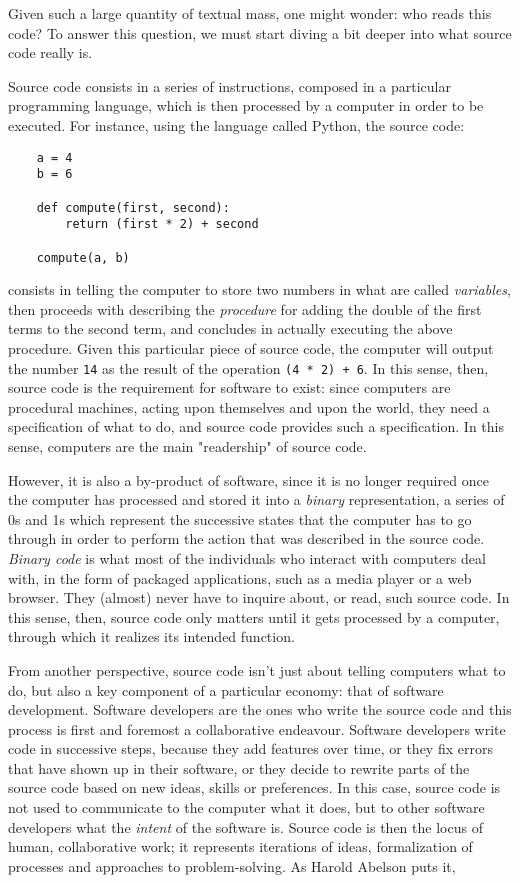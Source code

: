 Given such a large quantity of textual mass, one might wonder: who reads this code? To answer this question, we must start diving a bit deeper into what source code really is.

Source code consists in a series of instructions, composed in a particular programming language, which is then processed by a computer in order to be executed. For instance, using the language called Python, the source code:

\begin{lstlisting}
    a = 4
    b = 6

    def compute(first, second):
        return (first * 2) + second
    
    compute(a, b)
\end{lstlisting}

consists in telling the computer to store two numbers in what are called \emph{variables}, then proceeds with describing the \emph{procedure} for adding the double of the first terms to the second term, and concludes in actually executing the above procedure. Given this particular piece of source code, the computer will output the number \lstinline{14} as the result of the operation \lstinline{(4 * 2) + 6}. In this sense, then, source code is the requirement for software to exist: since computers are procedural machines, acting upon themselves and upon the world, they need a specification of what to do, and source code provides such a specification. In this sense, computers are the main "readership" of source code.

However, it is  also a by-product of software, since it is no longer required once the computer has processed and stored it into a \emph{binary} representation, a series of 0s and 1s which represent the successive states that the computer has to go through in order to perform the action that was described in the source code. \emph{Binary code} is what most of the individuals who interact with computers deal with, in the form of packaged applications, such as a media player or a web browser. They (almost) never have to inquire about, or read, such source code. In this sense, then, source code only matters until it gets processed by a computer, through which it realizes its intended function.

From another perspective, source code isn't just about telling computers what to do, but also a key component of a particular economy: that of software development. Software developers are the ones who write the source code and this process is first and foremost a collaborative endeavour. Software developers write code in successive steps, because they add features over time, or they fix errors that have shown up in their software, or they decide to rewrite parts of the source code based on new ideas, skills or preferences. In this case, source code is not used to communicate to the computer what it does, but to other software developers what the \emph{intent} of the software is. Source code is then the locus of human, collaborative work; it represents iterations of ideas, formalization of processes and approaches to problem-solving. As Harold Abelson puts it, 

